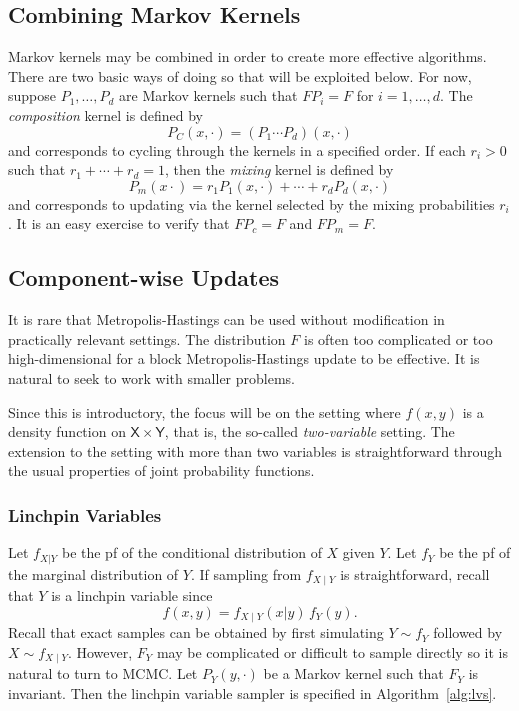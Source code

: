 \documentclass[12pt]{article}
\theoremstyle{plain}
\theoremstyle{definition}
\theoremstyle{remark}
\newcommand{\X}{\mathsf{X}}
\newcommand{\Y}{\mathsf{Y}}
\begin{document}
\subsection{Combining Markov Kernels}
\label{mcmc:sec:combining.kernels}

Markov kernels may be combined in order to create more effective
algorithms.  There are two basic ways of doing so that will be
exploited below.  For now, suppose $P_{1}, \ldots, P_{d}$ are Markov
kernels such that $FP_{i} = F$ for $i=1,\ldots,d$. The {\em
  composition} kernel is defined by
\[
P_C(x, \cdot) = (P_{1} \cdots P_{d})(x, \cdot) 
\]
and corresponds to cycling through the kernels in a specified
order. If each $r_i > 0$ such that $r_{1} + \cdots + r_{d} =1$, then
the {\em mixing} kernel is defined by
\[
  P_{m}(x \cdot) = r_{1} P_{1}(x, \cdot) + \cdots + r_{d} P_{d}(x, \cdot)
\]
and corresponds to updating via the kernel selected by the mixing 
probabilities $r_i$. It is an easy exercise to verify that $FP_{c} = F$ and $FP_{m} =
F$.

\subsection{Component-wise Updates}
\label{mcmc:sec:componentwise}

It is rare that Metropolis-Hastings can be used without modification in
practically relevant settings.  The distribution $F$ is often
too complicated or too high-dimensional for a block
Metropolis-Hastings update to be effective.  It is natural to seek to
work with smaller problems.

Since this is introductory, the focus will be on the setting where
$f(x,y)$ is a density function on $\X \times \Y$, that is, the
so-called {\em two-variable} setting.  The extension to the setting
with more than two variables is straightforward through the usual
properties of joint probability functions.

\subsubsection{Linchpin Variables}
\label{mcmc:sec:linchpin}

Let $f_{X|Y}$ be the pf of the conditional distribution
of $X$ given $Y$. Let $f_Y$ be the pf of the marginal
distribution of $Y$. If sampling from $f_{X\mid Y}$ is
straightforward, recall that $Y$ is a linchpin variable
 since
% 
\begin{equation}
  \label{eq:lv}
f(x,y) = f_{X \mid Y}(x|y)\, f_Y(y). 
\end{equation}
% 
Recall that exact samples can be obtained by first simulating $Y \sim f_{Y}$
followed by $X \sim f_{X \mid Y}$.  However, $F_{Y}$ may be complicated or difficult to sample directly so
it is natural to turn to MCMC.  Let $P_{Y}(y, \cdot)$ be a Markov
kernel such that $F_{Y}$ is invariant.  Then the linchpin variable
sampler is specified in Algorithm~\ref{alg:lvs}.
\end{document}
